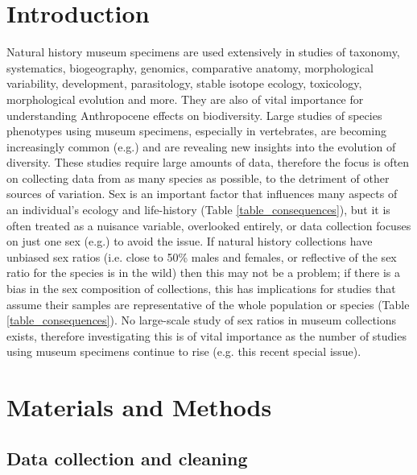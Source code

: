 \documentclass[a4paper, 12pt]{article}
\begin{document}
\section{Introduction}\label{main}
Natural history museum specimens are used extensively in studies of taxonomy, systematics, biogeography, genomics, comparative anatomy, morphological variability, development, parasitology, stable isotope ecology, toxicology, morphological evolution and more\cite{lister2011natural,pyke2010biological,mclean2015natural}. 
They are also of vital importance for understanding Anthropocene effects on biodiversity\cite{meineke2018biological}. 
Large studies of species phenotypes using museum specimens, especially in vertebrates, are becoming increasingly common (e.g.\cite{cooney2017mega,felice2018developmental}) and are revealing new insights into the evolution of diversity. 
These studies require large amounts of data, therefore the focus is often on collecting data from as many species as possible, to the detriment of other sources of variation. 
Sex is an important factor that influences many aspects of an individual's ecology and life-history (Table \ref{table_consequences}), but it is often treated as a nuisance variable, overlooked entirely, or data collection focuses on just one sex (e.g.\cite{cooper2009factors}) to avoid the issue. 
If natural history collections have unbiased sex ratios (i.e. close to 50\% males and females, or reflective of the sex ratio for the species is in the wild\cite{karlin1986theoretical}) then this may not be a problem; if there is a bias in the sex composition of collections, this has implications for studies that assume their samples are representative of the whole population or species (Table \ref{table_consequences}). 
No large-scale study of sex ratios in museum collections exists, therefore investigating this is of vital importance as the number of studies using museum specimens continue to rise (e.g. this recent special issue\cite{meineke2018biological}).

\newpage
\begin{landscape}
  
\end{landscape}


\section{Materials and Methods}
\subsection{Data collection and cleaning}
\end{document}

